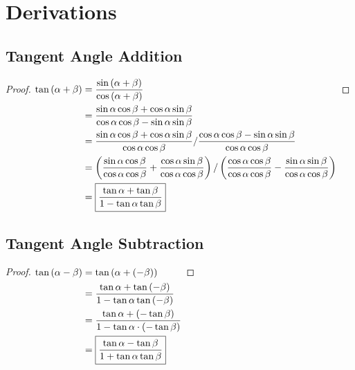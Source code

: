 \documentclass{article}
\begin{document}
\pagebreak
\section{Derivations}

\subsection{Tangent Angle Addition}
\label{proof:tanadd}
\begin{proof}
	$\begin{aligned}[t]
		\tan\left(\alpha+\beta\right)
		&=\frac{\sin\left(\alpha+\beta\right)}
			 {\cos\left(\alpha+\beta\right)} \\
		&=\frac{\sin\alpha\cos\beta+\cos\alpha\sin\beta}
			 {\cos\alpha\cos\beta-\sin\alpha\sin\beta} \\
		&=\frac{\sin\alpha\cos\beta+\cos\alpha\sin\beta}{\cos\alpha\cos\beta}/
		\frac{\cos\alpha\cos\beta-\sin\alpha\sin\beta}{\cos\alpha\cos\beta} \\
		&=\left(\frac{\sin\alpha\cos\beta}{\cos\alpha\cos\beta}+
		\frac{\cos\alpha\sin\beta}{\cos\alpha\cos\beta}\right)/
		\left(\frac{\cos\alpha\cos\beta}{\cos\alpha\cos\beta}-
		\frac{\sin\alpha\sin\beta}{\cos\alpha\cos\beta}\right) \\
		&=\boxed{\frac{\tan\alpha+\tan\beta}{1-\tan\alpha\tan\beta}} \\
	\end{aligned} \\$
\end{proof}

\subsection{Tangent Angle Subtraction}
\label{proof:tansub}
\begin{proof}
	$\begin{aligned}[t]
		\tan\left(\alpha-\beta\right)
		&=\tan\left(\alpha+\left(-\beta\right)\right) \\
		&=\frac{\tan\alpha+\tan\left(-\beta\right)}
			 {1-\tan\alpha\tan\left(-\beta\right)} \\
		&=\frac{\tan\alpha+\left(-\tan\beta\right)}
			 {1-\tan\alpha\cdot\left(-\tan\beta\right)} \\
		&=\boxed{\frac{\tan\alpha-\tan\beta}{1+\tan\alpha\tan\beta}} \\
	\end{aligned} \\$
\end{proof}
\end{document}
